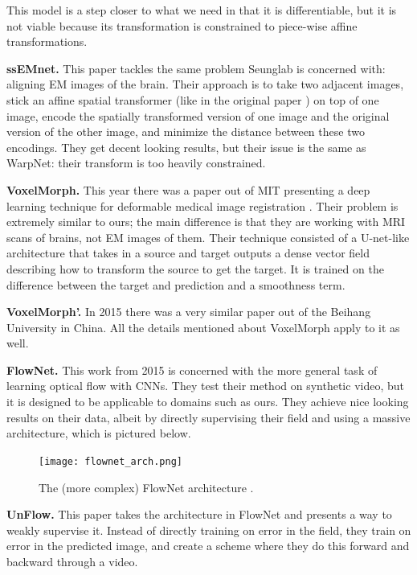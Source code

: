 \documentclass[12pt,a4paper]{article}
\begin{document}
This model is a step closer to what we need in that it is differentiable, but it is not viable because its transformation is constrained to piece-wise affine transformations.

{\bf ssEMnet.} This paper tackles the same problem Seunglab is concerned with: aligning EM images of the brain. Their approach is to take two adjacent images, stick an affine spatial transformer (like in the original paper \cite{stn}) on top of one image, encode the spatially transformed version of one image and the original version of the other image, and minimize the distance between these two encodings. They get decent looking results, but their issue is the same as WarpNet: their transform is too heavily constrained.

{\bf VoxelMorph.} This year there was a paper out of MIT presenting a deep learning technique for deformable medical image registration \cite{voxelmorph}. Their problem is extremely similar to ours; the main difference is that they are working with MRI scans of brains, not EM images of them. Their technique consisted of a U-net-like \cite{unet} architecture that takes in a source and target outputs a dense vector field describing how to transform the source to get the target. It is trained on the difference between the target and prediction and a smoothness term.

{\bf VoxelMorph'.} In 2015 there was a very similar paper \cite{voxelmorph_clone} out of the Beihang University in China. All the details mentioned about VoxelMorph apply to it as well.

{\bf FlowNet.} This work \cite{flownet} from 2015 is concerned with the more general task of learning optical flow with CNNs. They test their method on synthetic video, but it is designed to be applicable to domains such as ours. They achieve nice looking results on their data, albeit by directly supervising their field and using a massive architecture, which is pictured below.

\begin{figure}[h!]
\centering
\texttt{[image: flownet\_arch.png]}
\caption{\label{fig:flownet}The (more complex) FlowNet architecture \cite{flownet}.}
\end{figure}

{\bf UnFlow.} This paper \cite{unflow} takes the architecture in FlowNet and presents a way to weakly supervise it. Instead of directly training on error in the field, they train on error in the predicted image, and create a scheme where they do this forward and backward through a video.
\end{document}
